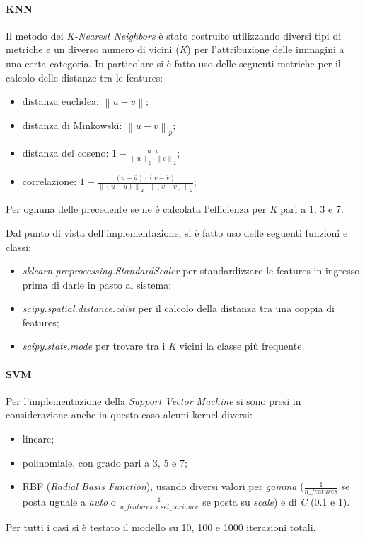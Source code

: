 \documentclass[11pt, a4paper, titlepage]{article}
\begin{document}
\paragraph{KNN}
Il metodo dei \emph{K-Nearest Neighbors} è stato costruito utilizzando diversi tipi di metriche e un diverso numero di vicini (\emph{K}) per l'attribuzione delle immagini a una certa categoria. In particolare si è fatto uso delle seguenti metriche per il calcolo delle distanze tra le features:
\begin{itemize}
    \item distanza euclidea: 
    \begin{math} \left \| u - v \right \| \end{math};
    \item distanza di Minkowski:
    \begin{math} \left \| u - v \right \|_p \end{math};
    \item distanza del coseno: 
    \begin{math} 1 - \frac{u \cdot v}{\left \| u \right \|_2 \cdot \left \| v \right \|_2} \end{math};
    \item correlazione: 
    \begin{math} 1 - \frac{(u - \bar u) \cdot (v - \bar v)}{\left \| (u - \bar u) \right \|_2 \cdot \left \| (v - \bar v) \right \|_2} \end{math};
\end{itemize}
Per ognuna delle precedente se ne è calcolata l'efficienza per \emph{K} pari a 1, 3 e 7.

\medskip
Dal punto di vista dell'implementazione, si è fatto uso delle seguenti funzioni e classi:
\begin{itemize}
    \item \emph{sklearn.preprocessing.StandardScaler} \cite{scikit-learn} per standardizzare le features in ingresso prima di darle in pasto al sistema;
    \item \emph{scipy.spatial.distance.cdist} \cite{scipy} per il calcolo della distanza tra una coppia di features;
    \item \emph{scipy.stats.mode} \cite{scipy} per trovare tra i \emph{K} vicini la classe più frequente.  
\end{itemize}

\paragraph{SVM}
Per l'implementazione della \emph{Support Vector Machine} si sono presi in considerazione anche in questo caso alcuni kernel diversi:
\begin{itemize}
    \item lineare; 
    \item polinomiale, con grado pari a 3, 5 e 7;
    \item RBF (\emph{Radial Basis Function}), usando diversi valori per \emph{gamma} ($\frac{1}{n\_features}$ se posta uguale a \emph{auto} o $\frac{1}{n\_features \times set\_variance}$ se posta su \emph{scale}) e di \emph{C} (0.1 e 1).
\end{itemize}
Per tutti i casi si è testato il modello su 10, 100 e 1000 iterazioni totali.
\end{document}
